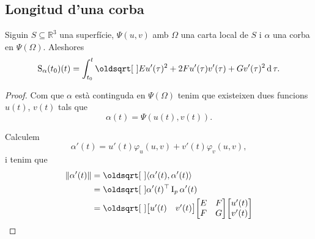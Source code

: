 \documentclass[../../Main.tex]{subfiles}
\begin{document}
	\subsection{Longitud d'una corba}
	\begin{proposition}
		\label{prop:longitud d'una corba en una superfície}
		Siguin \(S\subseteq\mathbb{R}^{3}\) una superfície, \(\Psi(u,v)\) amb \(\Omega\) una carta local de \(S\) i \(\alpha\) una corba en \(\Psi(\Omega)\). Aleshores
		\[\funciolongituddarc_{\alpha}(t_{0})(t)=\int_{t_{0}}^{t}\sqrt{Eu'(\tau)^{2}+2Fu'(\tau)v'(\tau)+Gv'(\tau)^{2}}\diff \tau.\]
		\begin{proof}
			Com que \(\alpha\) està continguda en \(\Psi(\Omega)\) tenim que existeixen dues funcions \(u(t)\), \(v(t)\) tals que
			\[\alpha(t)=\Psi(u(t),v(t)).\]
			
			Calculem
			\[\alpha'(t)=u'(t)\varphi_{u}(u,v)+v'(t)\varphi_{v}(u,v),\]
			i tenim que
			\begin{align*}
				\norm{\alpha'(t)}&=\sqrt{\prodesc{\alpha'(t)}{\alpha'(t)}} \\
				&=\sqrt{\alpha'(t)^{\transposta}\I_{p}\alpha'(t)} \\
				&=\sqrt{\begin{bmatrix}
					u'(t) & v'(t)
				\end{bmatrix}
				\begin{bmatrix}
					E & F \\
					F & G
				\end{bmatrix}
				\begin{bmatrix}
					u'(t) \\
					v'(t)
				\end{bmatrix}}
			\end{align*}
		\end{proof}
	\end{proposition}
	
\end{document}
